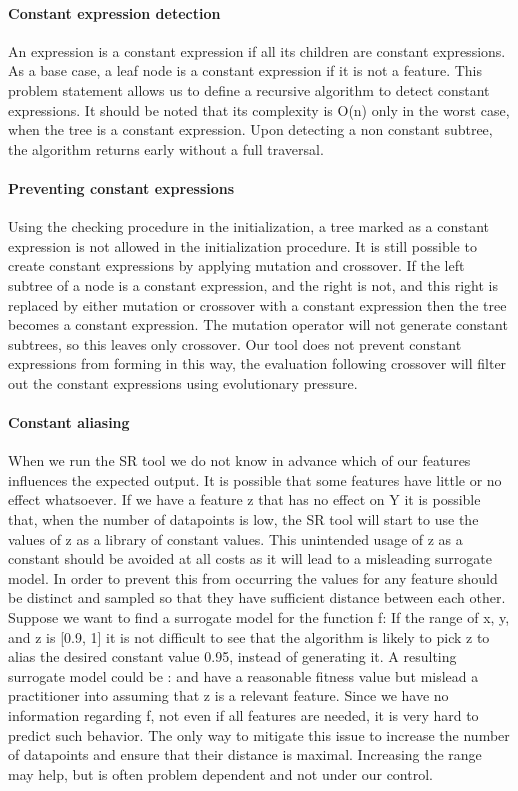 \paragraph{Constant expression detection}
An expression is a constant expression if all its children are constant expressions. As a base case, a leaf node is a constant expression if it is not a feature. This problem statement allows us to define a recursive algorithm to detect constant expressions. It should be noted that its complexity is O(n) only in the worst case, when the tree is a constant expression. Upon detecting a non constant subtree, the algorithm returns early without a full traversal. 

\paragraph{Preventing constant expressions}
Using the checking procedure in the initialization, a tree marked as a constant expression is not allowed in the initialization procedure.
It is still possible to create constant expressions by applying mutation and crossover. If the left subtree of a node is a constant expression, and the right is not, and this right is replaced by either mutation or crossover with a constant expression then the tree becomes a constant expression. The mutation operator will not generate constant subtrees, so this leaves only crossover. Our tool does not prevent constant expressions from forming in this way, the evaluation following crossover will filter out the constant expressions using evolutionary pressure.

\paragraph{Constant aliasing}
When we run the SR tool we do not know in advance which of our features influences the expected output. It is possible that some features have little or no effect whatsoever. If we have a feature z that has no effect on Y it is possible that, when the number of datapoints is low, the SR tool will start to use the values of z as a library of constant values. This unintended usage of z as a constant should be avoided at all costs as it will lead to a misleading surrogate model. In order to prevent this from occurring the values for any feature should be distinct and sampled so that they have sufficient distance between each other. Suppose we want to find a surrogate model for the function f:
If the range of x, y, and z is [0.9, 1] it is not difficult to see that the algorithm is likely to pick z to alias the desired constant value 0.95, instead of generating it. A resulting surrogate model could be :
and have a reasonable fitness value but mislead a practitioner into assuming that z is a relevant feature. Since we have no information regarding f, not even if all features are needed, it is very hard to predict such behavior. The only way to mitigate this issue to increase the number of datapoints and ensure that their distance is maximal. Increasing the range may help, but is often problem dependent and not under our control.

